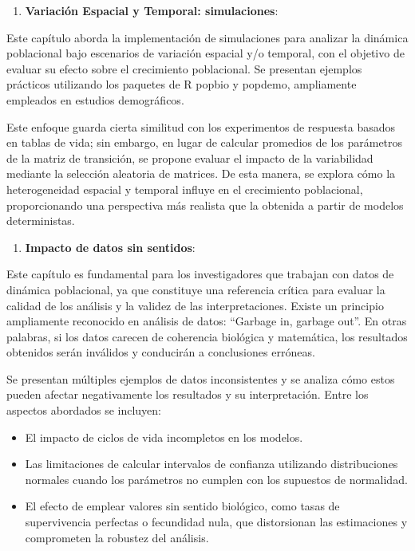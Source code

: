 \documentclass[
  12pt,
  letterpaper,
]{book}
\providecommand{\tightlist}{%
  \setlength{\itemsep}{0pt}\setlength{\parskip}{0pt}}\usepackage{longtable,booktabs,array}
\begin{document}
\begin{enumerate}
\def\labelenumi{\arabic{enumi}.}
\setcounter{enumi}{12}
\tightlist
\item
  \textbf{Variación Espacial y Temporal: simulaciones}:
\end{enumerate}

Este capítulo aborda la implementación de simulaciones para analizar la
dinámica poblacional bajo escenarios de variación espacial y/o temporal,
con el objetivo de evaluar su efecto sobre el crecimiento poblacional.
Se presentan ejemplos prácticos utilizando los paquetes de R popbio y
popdemo, ampliamente empleados en estudios demográficos.

Este enfoque guarda cierta similitud con los experimentos de respuesta
basados en tablas de vida; sin embargo, en lugar de calcular promedios
de los parámetros de la matriz de transición, se propone evaluar el
impacto de la variabilidad mediante la selección aleatoria de matrices.
De esta manera, se explora cómo la heterogeneidad espacial y temporal
influye en el crecimiento poblacional, proporcionando una perspectiva
más realista que la obtenida a partir de modelos deterministas.

\begin{enumerate}
\def\labelenumi{\arabic{enumi}.}
\setcounter{enumi}{13}
\tightlist
\item
  \textbf{Impacto de datos sin sentidos}:
\end{enumerate}

Este capítulo es fundamental para los investigadores que trabajan con
datos de dinámica poblacional, ya que constituye una referencia crítica
para evaluar la calidad de los análisis y la validez de las
interpretaciones. Existe un principio ampliamente reconocido en análisis
de datos: ``Garbage in, garbage out''. En otras palabras, si los datos
carecen de coherencia biológica y matemática, los resultados obtenidos
serán inválidos y conducirán a conclusiones erróneas.

Se presentan múltiples ejemplos de datos inconsistentes y se analiza
cómo estos pueden afectar negativamente los resultados y su
interpretación. Entre los aspectos abordados se incluyen:

\begin{itemize}
\tightlist
\item
  El impacto de ciclos de vida incompletos en los modelos.
\item
  Las limitaciones de calcular intervalos de confianza utilizando
  distribuciones normales cuando los parámetros no cumplen con los
  supuestos de normalidad.
\item
  El efecto de emplear valores sin sentido biológico, como tasas de
  supervivencia perfectas o fecundidad nula, que distorsionan las
  estimaciones y comprometen la robustez del análisis.
\end{itemize}
\end{document}

